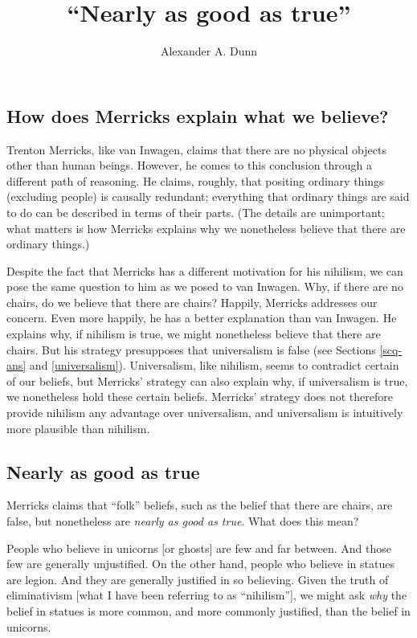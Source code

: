 \documentclass[11pt]{article}
\title{``Nearly as good as true''}
\author{Alexander A. Dunn}
\newenvironment{squote}{%
\begin{spacing}{1}
       	\begin{list}{}{%
\setlength{\labelwidth}{0pt}%
\rightmargin\leftmargin%
}
\item\relax
}{%
\end{list}%
\end{spacing}
}
\begin{document}
\ifstandalone
\maketitle
\begin{spacing}{1.25}
\fi

\section{How does Merricks explain what we believe?}
\label{universe}
\label{merricks}
Trenton Merricks, like van Inwagen, claims that there are no physical
objects other than human beings.  However, he comes to this conclusion
through a different path of reasoning.  He claims, roughly, that
positing ordinary things (excluding people) is causally redundant;
everything that ordinary things are said to do can be described in
terms of their parts. (The details are unimportant; what matters is
how Merricks explains why we nonetheless believe that there are
ordinary things.)

Despite the fact that Merricks has a different motivation for his
nihilism, we can pose the same question to him as we posed to van
Inwagen.  Why, if there are no chairs, do we believe that there are
chairs?  Happily, Merricks addresses our concern.  Even more happily,
he has a better explanation than van Inwagen.  He explains why, if
nihilism is true, we might nonetheless believe that there are chairs.
But his strategy presupposes that universalism is false (see Sections
\ref{scq-ans} and \ref{universalism}).  Universalism, like nihilism,
seems to contradict certain of our beliefs, but Merricks' strategy can
also explain why, if universalism is true, we nonetheless hold these
certain beliefs.  Merricks' strategy does not therefore provide
nihilism any advantage over universalism, and universalism is
intuitively more plausible than nihilism.

\subsection{Nearly as good as true}
\label{near}
Merricks claims that ``folk'' beliefs, such as the belief that there
are chairs, are false, but nonetheless are {\em nearly as good as
  true}.  What does this mean?

\begin{squote}
People who believe in unicorns [or ghosts] are few and far between.
And those few are generally unjustified.  On the other hand, people
who believe in statues are legion.  And they are generally justified
in so believing.  Given the truth of eliminativism [what I have been
  referring to as ``nihilism''], we might ask {\em why} the belief in
statues is more common, and more commonly justified, than the belief
in unicorns.


\end{squote}
\end{spacing}
\end{document}
